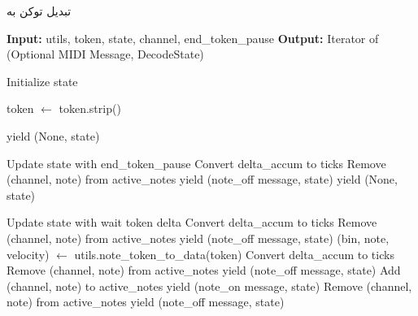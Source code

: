 \begin{LTR}
      \begin{algorithm}
            \caption{تبدیل توکن به }
            \label{al:tokenMidi}
            \setmainfont{Times New Roman}
            \begin{algorithmic}[1]
                  \State \textbf{Input:} utils, token, state, channel, end\_token\_pause
                  \State \textbf{Output:} Iterator of (Optional MIDI Message, DecodeState)

                  \State Initialize state
                  \EndIf

                  \State token $\leftarrow$ token.strip()

                  \State yield (None, state)
                  \Return
                  \EndIf

                  \State Update state with end\_token\_pause
                  \State Convert delta\_accum to ticks
                  \State Remove (channel, note) from active\_notes
                  \State yield (note\_off message, state)
                  \EndFor
                  \EndIf
                  \State yield (None, state)
                  \Return
                  \EndIf

                  \State Update state with wait token delta
                  \State Convert delta\_accum to ticks
                  \State Remove (channel, note) from active\_notes
                  \State yield (note\_off message, state)
                  \Return
                  \EndIf
                  \EndFor
                  \EndIf
                  \Else
                  \State (bin, note, velocity) $\leftarrow$ utils.note\_token\_to\_data(token)
                  \State Convert delta\_accum to ticks
                  \State Remove (channel, note) from active\_notes
                  \State yield (note\_off message, state)
                  \EndIf
                  \State Add (channel, note) to active\_notes
                  \State yield (note\_on message, state)
                  \Else
                  \State Remove (channel, note) from active\_notes
                  \State yield (note\_off message, state)
                  \EndIf
                  \EndIf


\end{algorithmic}
\end{algorithm}
\end{LTR}
